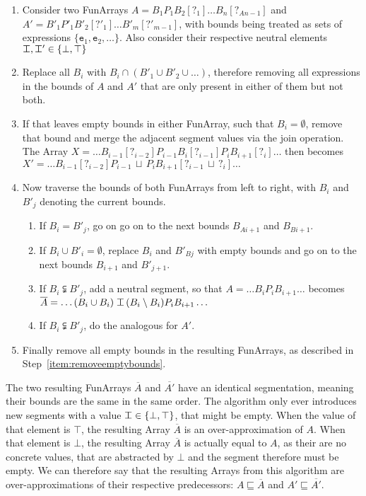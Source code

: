 \begin{enumerate}
  \item Consider two FunArrays $A=B_{1}P_{1}B_{2}[?_{1}]\ldots B_{n}[?_{An-1}]$ and $A'=B'_{1}\allowbreak P'_{1}\allowbreak B'_{2}\allowbreak[?'_{1}]\ldots B'_{m}[?'_{m-1}]$, with bounds being treated as sets of expressions $\{\mathtt{e}_1, \mathtt{e}_2,\ldots\}$. Also consider their respective neutral elements $\nElement,\nElement'\in \{\bot,\top\}$
  \item \label{item:restrictexpressions} Replace all $B_{i}$ with $B_{i}\cap(B'_{1}\cup B'_{2}\cup\ldots)$, therefore removing all expressions in the bounds of $A$ and $A'$ that are only present in either of them but not both.
  \item \label{item:removeemptybounds} If that leaves empty bounds in either FunArray, such that $B_{i}=\emptyset$, remove that bound and merge the adjacent segment values via the join operation. The Array
  $X = \ldots B_{i-1}[?_{i-2}]\allowbreak P_{i-1} \allowbreak B_{i} [?_{i-1}] P_{i} B_{i+1} [?_{i}]\ldots$
  then becomes 
  $X'=\ldots B_{i-1}[?_{i-2}] \allowbreak P_{i-1}  \,\sqcup\, P_{i} B_{i+1} [?_{i-1} \,\sqcup\, ?_{i}]\ldots$
  \item \label{item:traverse} Now traverse the bounds of both FunArrays from left to right, with $B_{i}$ and $B'_{j}$ denoting the current bounds. 
  \begin{enumerate}[label*=\arabic*.]
  	\item If $B_{i} = B'_{j}$, go on go on to the next bounds $B_{Ai+1}$ and $B_{Bi+1}$.
    \item If $B_{i} \cup B'_{i} = \emptyset$, replace $B_{i}$ and $B'_{Bj}$ with empty bounds and go on to the next bounds $B_{i+1}$ and $B'_{j+1}$.
    \item \label{item:truesubset} If $B_{i} \subsetneqq B'_{j}$, add a neutral segment, so that $A=\ldots B_{i}P_{i}\allowbreak B_{i+1}\ldots$ becomes $\overline{A}=\ldots (B_{i} \cup B_{i}) \;\nElement\, (B_{i} \setminus B_{i}) P_{i}B_{i+1}\ldots$
    \item If $B_{i} \subsetneqq B'_{j}$, do the analogous for $A'$.
  \end{enumerate}
  \item Finally remove all empty bounds in the resulting FunArrays, as described in Step~\ref{item:removeemptybounds}.
\end{enumerate}

\noindent The two resulting FunArrays $\overline{A}$ and $\overline{A'}$ have an identical segmentation, meaning their bounds are the same in the same order. The algorithm only ever introduces new segments with a value $\nElement\in\{\bot,\top\}$, that might be empty. When the value of that element is $\top$, the resulting Array $\overline{A}$ is an over-approximation of $A$. When that element is $\bot$, the resulting Array $\overline{A}$ is actually equal to $A$, as their are no concrete values, that are abstracted by $\bot$ and the segment therefore must be empty. We can therefore say that the resulting Arrays from this algorithm are over-approximations of their respective predecessors: $A\sqsubseteq \overline{A}$ and $A'\sqsubseteq \overline{A'}$.

